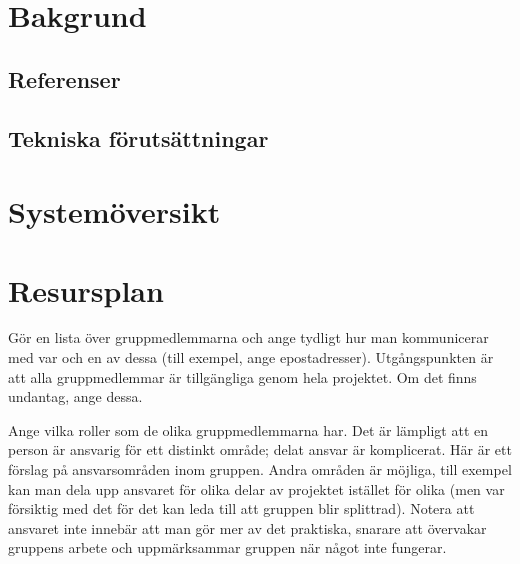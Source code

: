 \documentclass{article}
\begin{document}
\section{Bakgrund}

\subsection{Referenser}

\subsection{Tekniska förutsättningar}

\section{Systemöversikt}

\section{Resursplan}

Gör en lista över gruppmedlemmarna och ange tydligt hur man kommunicerar
med var och en av dessa (till exempel, ange epostadresser).
Utgångspunkten är att alla gruppmedlemmar är tillgängliga genom hela
projektet. Om det finns undantag, ange dessa.

Ange vilka roller som de olika gruppmedlemmarna har. Det är lämpligt att
en person är ansvarig för ett distinkt område; delat ansvar är
komplicerat. Här är ett förslag på ansvarsområden inom gruppen. Andra
områden är möjliga, till exempel kan man dela upp ansvaret för olika
delar av projektet istället för olika (men var försiktig med det för det
kan leda till att gruppen blir splittrad). Notera att ansvaret inte
innebär att man gör mer av det praktiska, snarare att övervakar gruppens
arbete och uppmärksammar gruppen när något inte fungerar.
\end{document}
